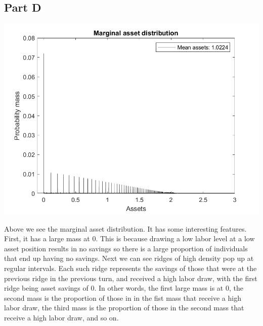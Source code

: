 \documentclass[11pt]{article} %
\begin{document}
\subsection{Part D}

\includegraphics{marginal}

Above we see the marginal asset distribution. It has some interesting features. First, it has a large mass at $0$. This is because drawing a low labor level at a low asset position results in no savings so there is a large proportion of individuals that end up having no savings. Next we can see ridges of high density pop up at regular intervals. Each such ridge represents the savings of those that were at the previous ridge in the previous turn, and received a high labor draw, with the first ridge being asset savings of 0. In other words, the first large mass is at 0, the second mass is the proportion of those in in the fist mass that receive a high labor draw, the third mass is the proportion of those in the second mass that receive a high labor draw, and so on.
\end{document}
